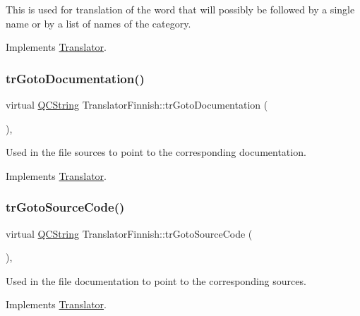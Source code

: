 This is used for translation of the word that will possibly be followed by a single name or by a list of names of the category. 

Implements \mbox{\hyperlink{class_translator}{Translator}}.

\mbox{\label{class_translator_finnish_a71567c85bcd1c8ab2b8367bd12ecd61c}} 
\subsubsection{\texorpdfstring{trGotoDocumentation()}{trGotoDocumentation()}}
{\footnotesize\ttfamily virtual \mbox{\hyperlink{class_q_c_string}{Q\+C\+String}} Translator\+Finnish\+::tr\+Goto\+Documentation (\begin{DoxyParamCaption}{ }\end{DoxyParamCaption})\hspace{0.3cm}{\ttfamily [inline]}, {\ttfamily [virtual]}}

Used in the file sources to point to the corresponding documentation. 

Implements \mbox{\hyperlink{class_translator}{Translator}}.

\mbox{\label{class_translator_finnish_aed68d02220dcdc517c2dba6d827068b9}} 
\subsubsection{\texorpdfstring{trGotoSourceCode()}{trGotoSourceCode()}}
{\footnotesize\ttfamily virtual \mbox{\hyperlink{class_q_c_string}{Q\+C\+String}} Translator\+Finnish\+::tr\+Goto\+Source\+Code (\begin{DoxyParamCaption}{ }\end{DoxyParamCaption})\hspace{0.3cm}{\ttfamily [inline]}, {\ttfamily [virtual]}}

Used in the file documentation to point to the corresponding sources. 

Implements \mbox{\hyperlink{class_translator}{Translator}}.

